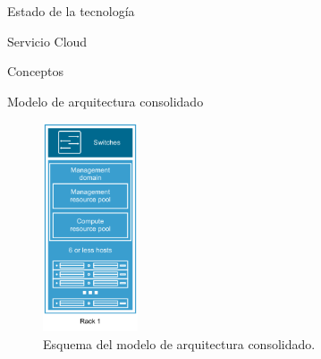 \begin{chapter}{Estado de la tecnología}
\begin{section}{Servicio Cloud}
\begin{subsection}{Conceptos}
\begin{subsubsection}{Modelo de arquitectura consolidado}
        \begin{figure}[h!]
          \centering
          \includegraphics[width=0.25\textwidth]{imaxes/conceptosPrevios/modelConsolidated.png}
          \caption{Esquema del modelo de arquitectura consolidado.}
          \label{fig:modeloconsolidated}
        \end{figure}        
        \end{subsubsection}
        \end{subsection}
        

\end{section}
\end{chapter}
